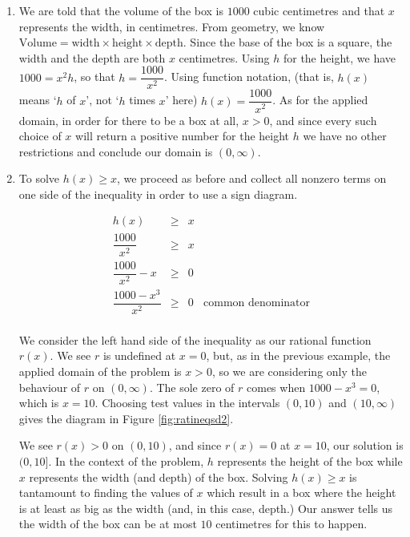{
\begin{enumerate}

\item  We are told that the volume of the box is $1000$ cubic centimetres and that $x$ represents the width, in centimetres.  From geometry, we know $\mbox{Volume} = \mbox{width} \times \mbox{height} \times \mbox{depth}$.  Since the base of the box is a square, the width and the depth are both $x$ centimetres.  Using $h$ for the height, we have $1000 = x^2h$, so that $h = \dfrac{1000}{x^2}$.  Using function notation, (that is, $h(x)$ means `$h$ of $x$', not `$h$ times $x$' here) $h(x) = \dfrac{1000}{x^2}$.  As for the applied domain, in order for there to be a box at all, $x > 0$, and since every such choice of $x$ will return a positive number for the height $h$ we have no other restrictions and  conclude our domain is $(0, \infty)$.

\item  To solve $h(x) \geq x$, we proceed as before and collect all nonzero terms on one side of the inequality in order to use a sign diagram.

\[ \begin{array}{rclr}

h(x) & \geq & x & \\ [10pt]

\dfrac{1000}{x^2} & \geq & x & \\ [10pt]

\dfrac{1000}{x^2} - x & \geq & 0 \\ [10pt]

\dfrac{1000-x^3}{x^2} & \geq & 0 & \mbox{common denominator} \\[10pt]

\end{array} \]

We consider the left hand side of the inequality as our rational function $r(x)$.  We see $r$ is undefined at $x=0$, but, as in the previous example, the applied domain of the problem is $x > 0$, so we are considering only the behaviour of $r$ on $(0, \infty)$.  The sole zero of $r$ comes when $1000-x^3 = 0$, which is $x=10$.  Choosing test values in the intervals $(0,10)$ and $(10, \infty)$ gives the diagram in Figure \ref{fig:ratineqsd2}.


We see $r(x) > 0$ on $(0,10)$, and since $r(x) = 0$ at $x=10$, our solution is $(0,10]$.  In the context of the problem, $h$ represents the height of the box while $x$ represents the width (and depth) of the box.  Solving $h(x) \geq x$ is tantamount to finding the values of $x$ which result in a box where the height is at least as big as the width (and, in this case, depth.)  Our answer tells us the width of the box can be at most $10$ centimetres for this to happen.


\end{enumerate}}
